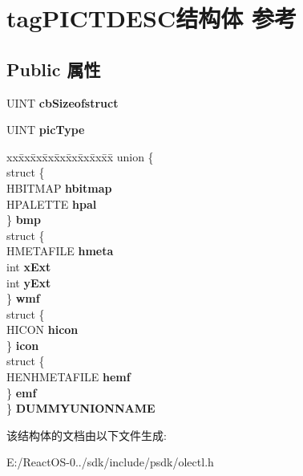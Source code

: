 \hypertarget{structtag_p_i_c_t_d_e_s_c}{}\section{tag\+P\+I\+C\+T\+D\+E\+S\+C结构体 参考}
\label{structtag_p_i_c_t_d_e_s_c}
\subsection*{Public 属性}
\begin{DoxyCompactItemize}
\item 
\mbox{\label{structtag_p_i_c_t_d_e_s_c_ae4b58fe50c0163dd19922a8c4f7b3070}} 
U\+I\+NT {\bfseries cb\+Sizeofstruct}
\item 
\mbox{\label{structtag_p_i_c_t_d_e_s_c_ab629132094938a00d4069689485c3119}} 
U\+I\+NT {\bfseries pic\+Type}
\item 
\mbox{\label{structtag_p_i_c_t_d_e_s_c_a444c928341925f3febff897f667908f8}} 
\begin{tabbing}
xx\=xx\=xx\=xx\=xx\=xx\=xx\=xx\=xx\=\kill
union \{\\
\>struct \{\\
\>\>HBITMAP {\bfseries hbitmap}\\
\>\>HPALETTE {\bfseries hpal}\\
\>\} {\bfseries bmp}\\
\>struct \{\\
\>\>HMETAFILE {\bfseries hmeta}\\
\>\>int {\bfseries xExt}\\
\>\>int {\bfseries yExt}\\
\>\} {\bfseries wmf}\\
\>struct \{\\
\>\>HICON {\bfseries hicon}\\
\>\} {\bfseries icon}\\
\>struct \{\\
\>\>HENHMETAFILE {\bfseries hemf}\\
\>\} {\bfseries emf}\\
\} {\bfseries DUMMYUNIONNAME}\\

\end{tabbing}\end{DoxyCompactItemize}


该结构体的文档由以下文件生成\+:\begin{DoxyCompactItemize}
\item 
E\+:/\+React\+O\+S-\/0../sdk/include/psdk/olectl.\+h\end{DoxyCompactItemize}
